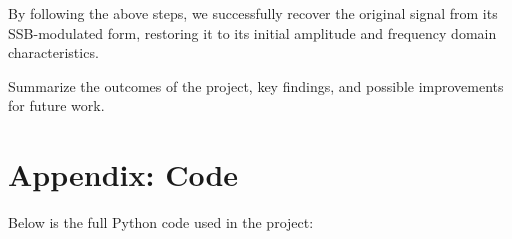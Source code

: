\documentclass[12pt,a4paper]{article}
\begin{document}
By following the above steps, we successfully recover the original signal from its SSB-modulated form, restoring it to its initial amplitude and frequency domain characteristics.

Summarize the outcomes of the project, key findings, and possible improvements for future work.

\newpage
\section*{Appendix: Code}
Below is the full Python code used in the project:






\newpage
\end{document}
